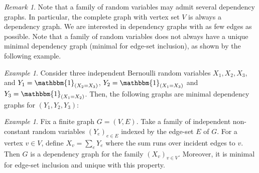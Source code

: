 \documentclass[12pt,a4paper,reqno]{amsart}
\theoremstyle{remark}
\newtheorem{example}[lemma]{Example}
\newtheorem{remark}[lemma]{Remark}
\begin{document}
\begin{remark}
Note that a family of random variables may admit several dependency graphs. In particular, the complete graph with vertex set $V$ is always a dependency graph. We are interested in dependency graphs with as few edges as possible. Note that a family of random variables does not always have a unique minimal dependency graph (minimal for edge-set inclusion), as shown by the following example.
\end{remark}
\medskip

\begin{example}
Consider three independent Bernoulli random variables $X_1,X_2,X_3$, and $Y_1=\mathbbm{1}_{(X_2=X_3)}$, $Y_2=\mathbbm{1}_{(X_1=X_3)}$ and $Y_3=\mathbbm{1}_{(X_1=X_2)}$. Then, the following graphs are minimal dependency graphs for $(Y_1,Y_2,Y_3)$:
\begin{center}
\end{center}
\end{example}

\begin{example}
Fix a finite graph $G=(V,E)$. Take a family of independent non-constant random variables $(Y_e)_{e \in E}$ 
indexed by the edge-set $E$ of $G$. For a vertex $v \in V$, define $X_v=\sum_e Y_e$ where the sum runs over incident edges to $v$. Then $G$ is a dependency graph for the family $(X_v)_{v \in V}$.  Moreover, it is minimal for edge-set inclusion and unique with this property. 
\end{example}
\bigskip
\end{document}
